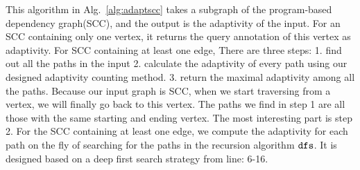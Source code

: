  
 This algorithm in Alg.~\ref{alg:adaptscc} takes a subgraph of the program-based dependency graph(SCC), and the output is the adaptivity of the input. 
 For an SCC containing only one vertex, it returns the query annotation of this vertex as adaptivity.
 For SCC containing at least one edge, 
 There are three steps: 1. find out all the paths in the input 2. calculate the adaptivity of every path using our designed adaptivity counting method. 3. return the maximal adaptivity among all the paths. Because our input graph is SCC, when we start traversing from a vertex, we will finally go back to this vertex. The paths we find in step 1 are all those with the same starting and ending vertex. The most interesting part is step 2. 
 For the SCC containing at least one edge, 
 we compute the adaptivity for each path 
 on the fly of searching for the paths 
 in the
 recursion algorithm $\mathtt{dfs}$. It is designed based on 
 a deep first search strategy 
 from line: 6-16.
